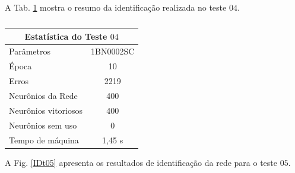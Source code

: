 A Tab. \ref{Estatistica do teste $04$} mostra o resumo da identificação realizada no teste $04$.

\begin{table}[H]
	\centering
	\caption{}
	\label{Estatistica do teste $04$}
	\begin{tabular}{@{}lc@{}}
		\toprule
		\multicolumn{2}{c}{Estatística do Teste $04$}         \\ \midrule
		Parâmetros                  & 1BN0002SC \\
		Época                       & 10       \\
		Erros                       & 2219       \\
		Neurônios da Rede           & 400       \\
		Neurônios vitoriosos        & 400       \\
		Neurônios sem uso           & 0         \\
		Tempo de máquina            & 1,45 s   \\ \bottomrule
	\end{tabular}
\end{table} 

A Fig. \ref{IDt05} apresenta os resultados de identificação da rede para o teste $05$.

